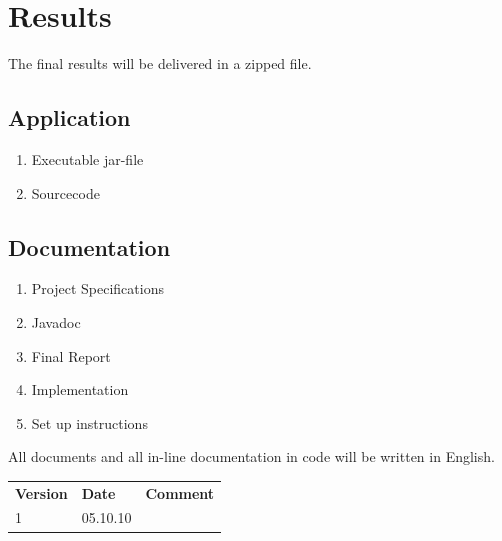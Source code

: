 \documentclass[a4paper,10pt,titlepage]{article}
\begin{document}
\section{Results}

The final results will be delivered in a zipped file.

\subsection{Application}
\begin{enumerate}
 \item Executable jar-file%
 \item Sourcecode
\end{enumerate}

\subsection{Documentation}
\begin{enumerate}
 \item Project Specifications
 \item Javadoc
 \item Final Report
 \item Implementation
 \item Set up instructions
\end{enumerate}

All documents and all in-line documentation in code will be written in English.


\newpage
\begin{tabularx}{\textwidth}{XXX}
\textbf{Version} & \textbf{Date} & \textbf{Comment}\\
1 & 05.10.10 & \\
\end{tabularx}
\end{document}

